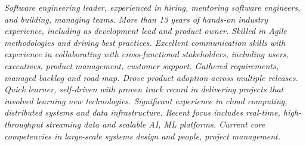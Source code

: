 {\selectfont
	\begin{justify}\textit{Software engineering leader, experienced in hiring, mentoring software engineers, and building, managing teams. More than 13 years of hands-on industry experience, including as development lead and product owner. Skilled in Agile methodologies and driving best practices. Excellent communication skills with experience in collaborating with cross-functional stakeholders, including users, executives, product management, customer support. Gathered requirements, managed backlog and road-map. Drove product adoption across multiple releases. Quick learner, self-driven with proven track record in delivering projects that involved learning new technologies. Significant experience in cloud computing, distributed systems and data infrastructure. Recent focus includes real-time, high-throughput streaming data and scalable AI, ML platforms. Current core competencies in large-scale systems design and people, project management.}\end{justify}
}